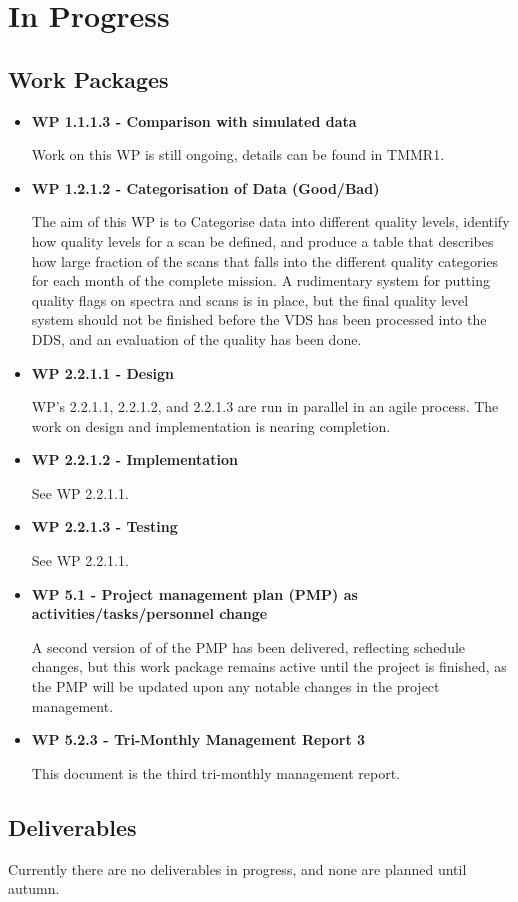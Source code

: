 \chapter{In Progress}
\label{chapter:in_progress}



\section{Work Packages}

\begin{itemize}

\item{\bf WP 1.1.1.3 - Comparison with simulated data}

Work on this WP is still ongoing, details can be found in TMMR1.


\item{\bf WP 1.2.1.2 - Categorisation of Data (Good/Bad)}

The aim of this WP is to Categorise data into different quality levels, identify how quality levels for a scan be defined, and produce a table that describes how large fraction of the scans that falls into the different quality categories for each month of the complete mission. A rudimentary system for putting quality flags on spectra and scans is in place, but the final quality level system should not be finished before the VDS has been processed into the DDS, and an evaluation of the quality has been done.   


\item{\bf WP 2.2.1.1 - Design}

WP's 2.2.1.1, 2.2.1.2, and 2.2.1.3 are run in parallel in an agile process. The work on design and implementation is nearing completion. 

\item{\bf WP 2.2.1.2 - Implementation}

See WP 2.2.1.1.

\item{\bf WP 2.2.1.3 - Testing}

See WP 2.2.1.1.


\item{\bf WP 5.1 - Project management plan (PMP) as activities/tasks/personnel change}

A second version of of the PMP has been delivered, reflecting schedule changes, but this work package remains active until the project is finished, as the PMP will be updated upon any notable
changes in the project management.

\item{\bf WP 5.2.3 - Tri-Monthly Management Report 3}

This document is the third tri-monthly management report. 


\end{itemize}


\section{Deliverables}

Currently there are no deliverables in progress, and none are planned until autumn.